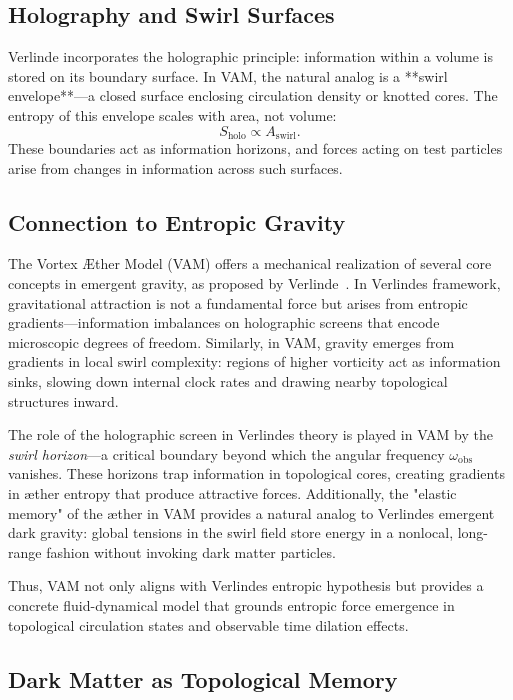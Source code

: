 \subsection*{Holography and Swirl Surfaces}

Verlinde incorporates the holographic principle: information within a volume is stored on its boundary surface. In VAM, the natural analog is a **swirl envelope**—a closed surface enclosing circulation density or knotted cores. The entropy of this envelope scales with area, not volume:
\begin{equation}
S_{\text{holo}} \propto A_{\text{swirl}}.
\end{equation}
These boundaries act as information horizons, and forces acting on test particles arise from changes in information across such surfaces.

\subsection*{Connection to Entropic Gravity}

The Vortex Æther Model (VAM) offers a mechanical realization of several core concepts in emergent gravity, as proposed by Verlinde~\cite{verlinde2017emergent}. In Verlinde\rqs s framework, gravitational attraction is not a fundamental force but arises from entropic gradients—information imbalances on holographic screens that encode microscopic degrees of freedom. Similarly, in VAM, gravity emerges from gradients in local swirl complexity: regions of higher vorticity act as information sinks, slowing down internal clock rates and drawing nearby topological structures inward.

The role of the holographic screen in Verlinde\rqs s theory is played in VAM by the \emph{swirl horizon}—a critical boundary beyond which the angular frequency $\omega_\text{obs}$ vanishes. These horizons trap information in topological cores, creating gradients in æther entropy that produce attractive forces. Additionally, the "elastic memory" of the æther in VAM provides a natural analog to Verlinde\rqs s emergent dark gravity: global tensions in the swirl field store energy in a nonlocal, long-range fashion without invoking dark matter particles.

Thus, VAM not only aligns with Verlinde\rqs s entropic hypothesis but provides a concrete fluid-dynamical model that grounds entropic force emergence in topological circulation states and observable time dilation effects.


\subsection*{Dark Matter as Topological Memory}

